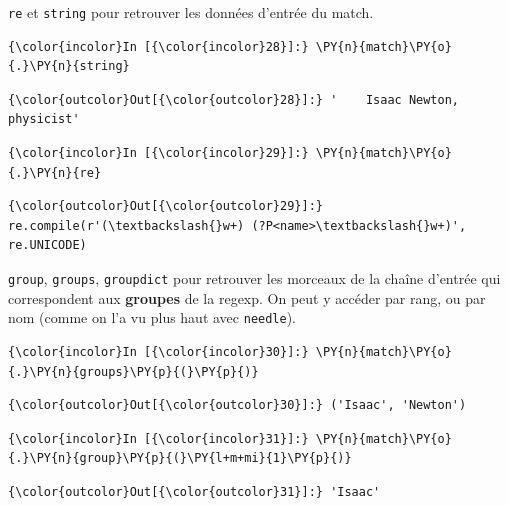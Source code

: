     \texttt{re} et \texttt{string} pour retrouver les données d'entrée du
match.

    \begin{Verbatim}[commandchars=\\\{\}]
{\color{incolor}In [{\color{incolor}28}]:} \PY{n}{match}\PY{o}{.}\PY{n}{string}
\end{Verbatim}


\begin{Verbatim}[commandchars=\\\{\}]
{\color{outcolor}Out[{\color{outcolor}28}]:} '    Isaac Newton, physicist'
\end{Verbatim}
            
    \begin{Verbatim}[commandchars=\\\{\}]
{\color{incolor}In [{\color{incolor}29}]:} \PY{n}{match}\PY{o}{.}\PY{n}{re}
\end{Verbatim}


\begin{Verbatim}[commandchars=\\\{\}]
{\color{outcolor}Out[{\color{outcolor}29}]:} re.compile(r'(\textbackslash{}w+) (?P<name>\textbackslash{}w+)', re.UNICODE)
\end{Verbatim}
            
    \texttt{group}, \texttt{groups}, \texttt{groupdict} pour retrouver les
morceaux de la chaîne d'entrée qui correspondent aux \textbf{groupes} de
la regexp. On peut y accéder par rang, ou par nom (comme on l'a vu plus
haut avec \texttt{needle}).

    \begin{Verbatim}[commandchars=\\\{\}]
{\color{incolor}In [{\color{incolor}30}]:} \PY{n}{match}\PY{o}{.}\PY{n}{groups}\PY{p}{(}\PY{p}{)}
\end{Verbatim}


\begin{Verbatim}[commandchars=\\\{\}]
{\color{outcolor}Out[{\color{outcolor}30}]:} ('Isaac', 'Newton')
\end{Verbatim}
            
    \begin{Verbatim}[commandchars=\\\{\}]
{\color{incolor}In [{\color{incolor}31}]:} \PY{n}{match}\PY{o}{.}\PY{n}{group}\PY{p}{(}\PY{l+m+mi}{1}\PY{p}{)}
\end{Verbatim}


\begin{Verbatim}[commandchars=\\\{\}]
{\color{outcolor}Out[{\color{outcolor}31}]:} 'Isaac'
\end{Verbatim}
            
